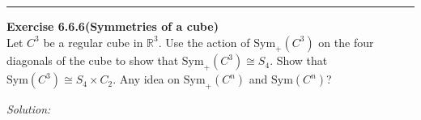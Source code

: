 \documentclass[a4paper, 12pt]{article}
\newenvironment{problem}[2][Exercise]
    { \begin{mdframed}[backgroundcolor=gray!20] \textbf{#1 #2} \\}
    {  \end{mdframed}}
\newenvironment{solution}
    {\textit{Solution:}}
    {}
\begin{document}
\noindent\rule{7in}{2.8pt}
\begin{problem}{6.6.6(Symmetries of a cube)}
Let \(C^3\) be a regular cube in \(\mathbb{R}^3\). Use the action of \(\text{Sym}_+(C^3)\) on the four diagonals of the cube to show that \(\text{Sym}_+(C^3)\cong S_4\). Show that 
\(\text{Sym}(C^3)\cong S_4\times C_2\). Any idea on \(\text{Sym}_+(C^n)\) and \(\text{Sym}(C^n)\)?
\end{problem}
\begin{solution}
    
\end{solution}
\end{document}
